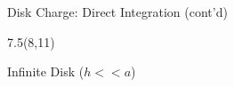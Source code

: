 \begin{lesson19}
\begin{frame}{Disk Charge: Direct Integration (cont'd)}
\begin{textblock}{7.5}(8,11)

\begin{myblock}[0.9]{Infinite Disk ($h<<a$)}
\vspace{-12pt}
\end{myblock}

\end{textblock}

\end{frame}


\end{lesson19}
